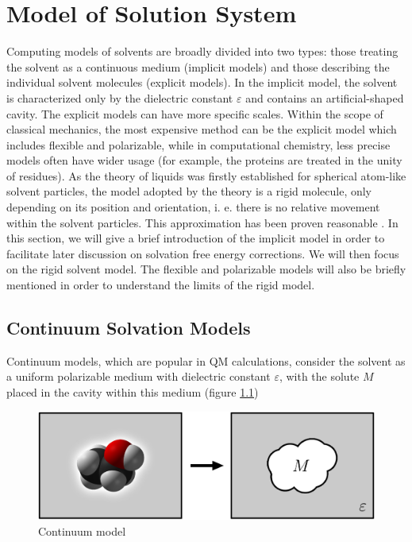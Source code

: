 
\chapter{Model of Solution System\label{chpt:models}}

Computing models of solvents are broadly divided into two types: those
treating the solvent as a continuous medium (implicit models) and
those describing the individual solvent molecules (explicit models).
In the implicit model, the solvent is characterized only by the dielectric
constant $\varepsilon$ and contains an artificial-shaped cavity.
The explicit models can have more specific scales. Within the scope
of classical mechanics, the most expensive method can be the explicit model %
which includes flexible and polarizable, while in computational chemistry, less precise
models often have wider usage (for example, the proteins are treated
in the unity of residues). As the theory of liquids was firstly established
for spherical atom-like solvent particles, the model adopted by the
theory is a rigid molecule, only depending on its position and orientation,
i. e. there is no relative movement within the solvent particles.
This approximation has been proven reasonable \citep{Gray-Gubbins}.
In this section, we will give a brief introduction of the implicit model in order
to facilitate later discussion on solvation free
energy corrections. We will then focus on the rigid solvent model. The
flexible and polarizable models will also be briefly mentioned in
order to understand the limits of the rigid model. 


\section{Continuum Solvation Models}

Continuum models, which are popular in QM calculations, consider the
solvent as a uniform polarizable medium with dielectric constant $\varepsilon$,
with the solute $M$ placed in the cavity within this medium \citep{Jensen}
(figure \ref{fig:Reaction-field-model}) 

\begin{figure}[h]
\begin{centering}
\includegraphics[width=0.75\columnwidth]{_figure/reaction-field-model_2}
\par\end{centering}

\caption{Continuum model\label{fig:Reaction-field-model}}
\end{figure}


